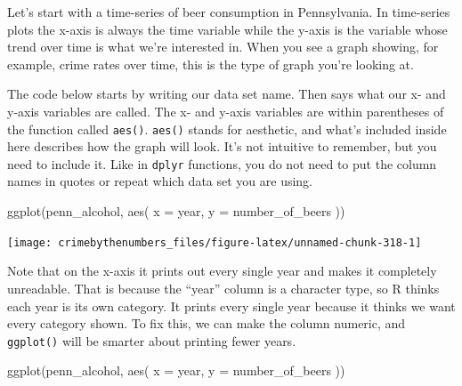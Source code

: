 \documentclass[
]{krantz}
\makeatletter
\newenvironment{Shaded}{\begin{snugshade}}{\end{snugshade}}
\newcommand{\AttributeTok}[1]{\textcolor[rgb]{0.61,0.61,0.61}{#1}}
\newcommand{\FunctionTok}[1]{\textcolor[rgb]{0,0,0}{#1}}
\newcommand{\NormalTok}[1]{#1}
\newcommand{\OtherTok}[1]{\textcolor[rgb]{0.37,0.37,0.37}{#1}}
\newcommand{\SpecialCharTok}[1]{\textcolor[rgb]{0,0,0}{#1}}
\newenvironment{kframe}{%
\medskip{}
\setlength{\fboxsep}{.8em}
 \def\at@end@of@kframe{}%
 \ifinner\ifhmode%
  \def\at@end@of@kframe{\end{minipage}}%
  \begin{minipage}{\columnwidth}%
 \fi\fi%
 \def\FrameCommand##1{\hskip\@totalleftmargin \hskip-\fboxsep
 \colorbox{shadecolor}{##1}\hskip-\fboxsep
     \hskip-\linewidth \hskip-\@totalleftmargin \hskip\columnwidth}%
 \MakeFramed {\advance\hsize-\width
   \@totalleftmargin\z@ \linewidth\hsize
   \@setminipage}}%
 {\par\unskip\endMakeFramed%
 \at@end@of@kframe}
\renewenvironment{Shaded}{\begin{kframe}}{\end{kframe}}
\makeatother
\begin{document}
Let's start with a time-series of beer consumption in
Pennsylvania. In time-series plots the x-axis is always the
time variable while the y-axis is the variable whose trend
over time is what we're interested in. When you see a graph
showing, for example, crime rates over time, this is the
type of graph you're looking at.

The code below starts by writing our data set name. Then
says what our x- and y-axis variables are called. The x- and
y-axis variables are within parentheses of the function
called \texttt{aes()}. \texttt{aes()} stands for aesthetic,
and what's included inside here describes how the graph will
look. It's not intuitive to remember, but you need to
include it. Like in \texttt{dplyr} functions, you do not
need to put the column names in quotes or repeat which data
set you are using.

\begin{Shaded}
\begin{Highlighting}[]
\FunctionTok{ggplot}\NormalTok{(penn\_alcohol, }\FunctionTok{aes}\NormalTok{(}
  \AttributeTok{x =}\NormalTok{ year,}
  \AttributeTok{y =}\NormalTok{ number\_of\_beers}
\NormalTok{))}
\end{Highlighting}
\end{Shaded}

\begin{center}\texttt{[image: crimebythenumbers\_files/figure-latex/unnamed-chunk-318-1]} \end{center}

Note that on the x-axis it prints out every single year and
makes it completely unreadable. That is because the ``year''
column is a character type, so R thinks each year is its own
category. It prints every single year because it thinks we
want every category shown. To fix this, we can make the
column numeric, and \texttt{ggplot()} will be smarter about
printing fewer years.

\begin{Shaded}
\end{Shaded}

\begin{Shaded}
\begin{Highlighting}[]
\FunctionTok{ggplot}\NormalTok{(penn\_alcohol, }\FunctionTok{aes}\NormalTok{(}
  \AttributeTok{x =}\NormalTok{ year,}
  \AttributeTok{y =}\NormalTok{ number\_of\_beers}
\NormalTok{))}
\end{Highlighting}
\end{Shaded}
\end{document}
